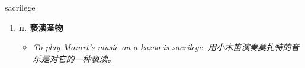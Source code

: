 
\begin{frame}
{\huge sacrilege}
\begin{center}
\begin{enumerate}\Large
  \item \textbf{n. 亵渎圣物}
  \begin{itemize}
    \item \em{\Large{To play Mozart's music on a kazoo is sacrilege. 用小木笛演奏莫扎特的音乐是对它的一种亵渎。}}
  \end{itemize}
\end{enumerate}
\end{center}
\end{frame}
